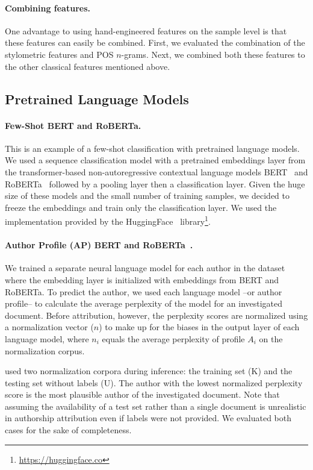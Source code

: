 \documentclass[11pt]{article}
\begin{document}
\paragraph{Combining features.} One advantage to using hand-engineered features on the sample level is that these features can easily be combined. First, we evaluated the combination of the stylometric features and POS $n$-grams. Next, we combined both these features to the other classical features mentioned above. 


\subsection{Pretrained Language Models}

\paragraph{Few-Shot BERT and RoBERTa.}
This is an example of a few-shot classification with pretrained language models. We used a sequence classification model with a pretrained embeddings layer from the transformer-based non-autoregressive contextual language models BERT~\citet{devlin2019bert} and RoBERTa~\citep{liu2019roberta} followed by a pooling layer then a classification layer. Given the huge size of these models and the small number of training samples, we decided to freeze the embeddings and train only the classification layer. We used the implementation provided by the HuggingFace~\citep{Wolf2019HuggingFacesTS} library\footnote{\url{https://huggingface.co}}.

\paragraph{Author Profile (AP) BERT and RoBERTa~\citep{Barlas2020,Barlas2021}.} 
We trained a separate neural language model for each author in the dataset where the embedding layer is initialized with embeddings from BERT and RoBERTa. To predict the author, we used each language model --or author profile-- to calculate the average perplexity of the model for an investigated document. Before attribution, however, the perplexity scores are normalized using a normalization vector ($n$) to make up for the biases in the output layer of each language model, where $n_i$ equals the average perplexity of profile $A_i$ on the normalization corpus.

\citet{Barlas2020,Barlas2021} used two normalization corpora during inference: the training set (K) and the testing set without labels (U). The author with the lowest normalized perplexity score is the most plausible author of the investigated document. Note that assuming the availability of a test set rather than a single document is unrealistic in authorship attribution even if labels were not provided. We evaluated both cases for the sake of completeness.  
\end{document}
